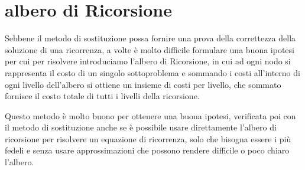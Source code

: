 \section{albero di Ricorsione}
Sebbene il metodo di sostituzione possa fornire una prova della correttezza della soluzione di una ricorrenza, a volte è molto difficile formulare una buona ipotesi
per cui per risolvere introduciamo l'albero di Ricorsione, in cui ad ogni nodo si rappresenta il costo di un singolo sottoproblema e sommando i costi all'interno di 
ogni livello dell'albero si ottiene un insieme di costi per livello, che sommato fornisce il costo totale di tutti i livelli della ricorsione.

Questo metodo è molto buono per ottenere una buona ipotesi, verificata poi con il metodo di sostituzione anche se è possibile usare direttamente l'albero di ricorsione
per risolvere un equazione di ricorrenza, solo che bisogna essere i più fedeli e senza usare approssimazioni che possono rendere difficile o poco chiaro l'albero.


